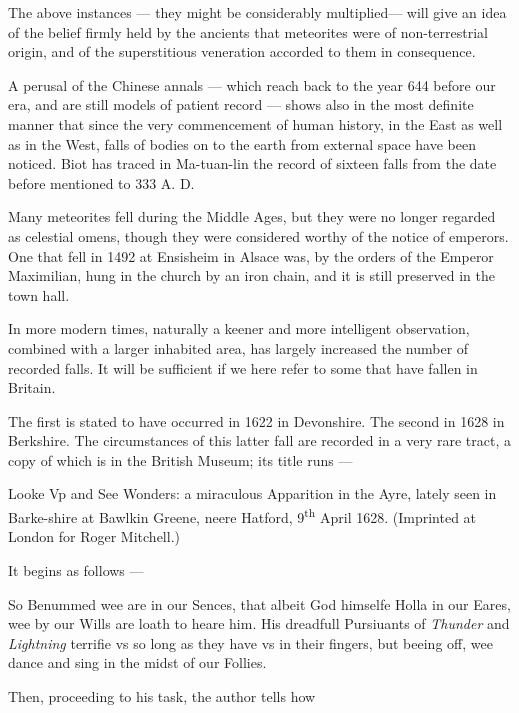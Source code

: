 \documentclass[a4paper, 12pt, oneside, polutonikogreek, english]{article}
\begin{document}
The above instances --- they might be considerably multiplied--- will give an idea of the belief firmly held by the ancients that meteorites were of non-terrestrial origin, and of the superstitious veneration accorded to them in consequence.

A perusal of the Chinese annals --- which reach back to the year 644 before our era, and are still models of patient record --- shows also in the most definite manner that since the very commencement of human history, in the East as well as in the West, falls of bodies on to the earth from external space have been noticed. Biot has traced in Ma-tuan-lin the record of sixteen falls from the date before mentioned to 333 A. D.

Many meteorites fell during the Middle Ages, but they were no longer regarded as celestial omens, though they were considered worthy of the notice of emperors. One that fell in 1492 at Ensisheim in Alsace was, by the orders of the Emperor Maximilian, hung in the church by an iron chain, and it is still preserved in the town hall.

In more modern times, naturally a keener and more intelligent observation, combined with a larger inhabited area, has largely increased the number of recorded falls. It will be sufficient if we here refer to some that have fallen in Britain.

The first is stated to have occurred in 1622 in Devonshire. The second in 1628 in Berkshire. The circumstances of this latter fall are recorded in a very rare tract, a copy of which is in the British Museum; its title runs ---

Looke Vp and See Wonders: a miraculous Apparition in the Ayre, lately seen in Barke-shire at Bawlkin Greene, neere Hatford, 9\textsuperscript{th} April 1628. (Imprinted at London for Roger Mitchell.)

It begins as follows ---

So Benummed wee are in our Sences, that albeit God himselfe Holla in our Eares, wee by our Wills are loath to heare him. His dreadfull Pursiuants of \emph{Thunder} and \emph{Lightning} terrifie vs so long as they have vs in their fingers, but beeing off, wee dance and sing in the midst of our Follies.

Then, proceeding to his task, the author tells how
\end{document}
